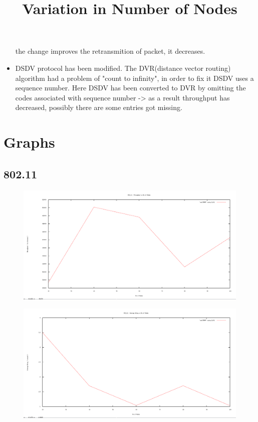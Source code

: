 \documentclass[12pt]{article}
\begin{document}
\begin{itemize}
    the change improves the retransmition of packet, it decreases.\\
    
    \item DSDV protocol has been modified. The DVR(distance vector routing) algorithm had a problem of "count to infinity", in order to fix it DSDV uses a sequence number. Here DSDV has been converted to DVR by omitting the codes associated with sequence number -> as a result throughput has decreased, possibly there are some entries got missing. \\
\end{itemize}



\newpage
\section{Graphs}
\subsection{802.11}

\title{Variation in Number of Nodes}
\begin{figure}[H]
	\centering
	\includegraphics[scale=	0.26]{image/802.11/Throughput_vs_nodes.png}
\end{figure}

\begin{figure}[H]
	\centering
	\includegraphics[scale=	0.26]{image/802.11/Averagedelay_vs_nodes.png}
\end{figure}
\end{document}
